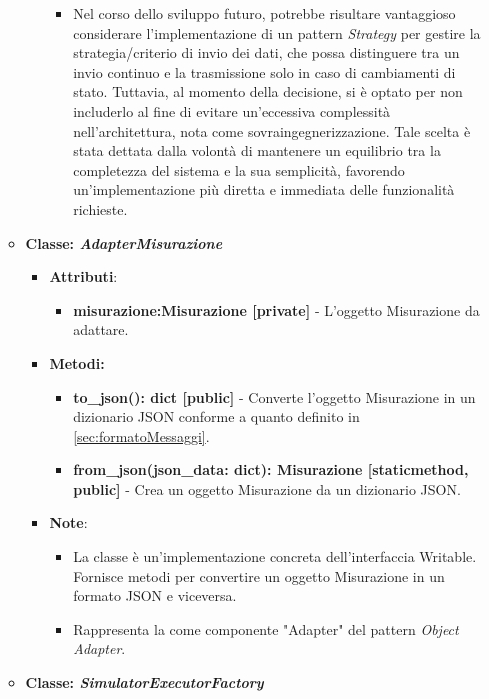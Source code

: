 \begin{itemize}
\begin{itemize}
\begin{itemize}
\begin{itemize}
            \item Nel corso dello sviluppo futuro, potrebbe risultare vantaggioso considerare l'implementazione di un pattern \textit{Strategy} per gestire la strategia/criterio di invio dei dati, che possa distinguere tra un invio continuo e la trasmissione solo in caso di cambiamenti di stato. Tuttavia, al momento della decisione, si è optato per non includerlo al fine di evitare un'eccessiva complessità nell'architettura, nota come sovraingegnerizzazione. Tale scelta è stata dettata dalla volontà di mantenere un equilibrio tra la completezza del sistema e la sua semplicità, favorendo un'implementazione più diretta e immediata delle funzionalità richieste.
        \end{itemize}
    \end{itemize}
    \item{\textbf{Classe: \textit{AdapterMisurazione}}}
    \begin{itemize}
    \item\textbf{Attributi}:
        \begin{itemize}
        \item \textbf{misurazione:Misurazione [private]} - L'oggetto Misurazione da adattare.
    \end{itemize}
    \item \textbf{Metodi: }
    \begin{itemize}
        \item \textbf{to\_json(): dict [public]} - Converte l'oggetto Misurazione in un dizionario JSON conforme a quanto definito in \ref{sec:formatoMessaggi}.
        \item \textbf{from\_json(json\_data: dict): Misurazione [staticmethod, public]} - Crea un oggetto Misurazione da un dizionario JSON.
    \end{itemize}
    \item\textbf{Note}:
        \begin{itemize}
            \item La classe è un'implementazione concreta dell'interfaccia Writable. Fornisce metodi per convertire un oggetto Misurazione in un formato JSON e viceversa.
            \item Rappresenta la come componente "Adapter" del pattern \textit{Object Adapter}.
        \end{itemize}
    \end{itemize}
    \item{\textbf{Classe: \textit{SimulatorExecutorFactory}}}
    \begin{itemize}

\end{itemize}
\end{itemize}
\end{itemize}
